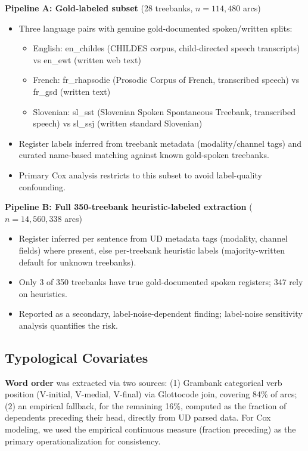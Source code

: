 \documentclass[11pt,letterpaper]{article}
\begin{document}
\textbf{Pipeline A: Gold-labeled subset} (28 treebanks, $n=114{,}480$ arcs)
\begin{itemize}
\item Three language pairs with genuine gold-documented spoken/written splits:
  \begin{itemize}
  \item English: en\_childes (CHILDES corpus, child-directed speech transcripts) vs en\_ewt (written web text)
  \item French: fr\_rhapsodie (Prosodic Corpus of French, transcribed speech) vs fr\_gsd (written text)
  \item Slovenian: sl\_sst (Slovenian Spoken Spontaneous Treebank, transcribed speech) vs sl\_ssj (written standard Slovenian)
  \end{itemize}
\item Register labels inferred from treebank metadata (modality/channel tags) and curated name-based matching against known gold-spoken treebanks.
\item Primary Cox analysis restricts to this subset to avoid label-quality confounding.
\end{itemize}

\textbf{Pipeline B: Full 350-treebank heuristic-labeled extraction} ($n=14{,}560{,}338$ arcs)
\begin{itemize}
\item Register inferred per sentence from UD metadata tags (modality, channel fields) where present, else per-treebank heuristic labels (majority-written default for unknown treebanks).
\item Only 3 of 350 treebanks have true gold-documented spoken registers; 347 rely on heuristics.
\item Reported as a secondary, label-noise-dependent finding; label-noise sensitivity analysis quantifies the risk.
\end{itemize}

\subsection{Typological Covariates}

\textbf{Word order} was extracted via two sources: (1) Grambank categorical verb position (V-initial, V-medial, V-final) via Glottocode join, covering 84\% of arcs; (2) an empirical fallback, for the remaining 16\%, computed as the fraction of dependents preceding their head, directly from UD parsed data. For Cox modeling, we used the empirical continuous measure (fraction preceding) as the primary operationalization for consistency.
\end{document}
